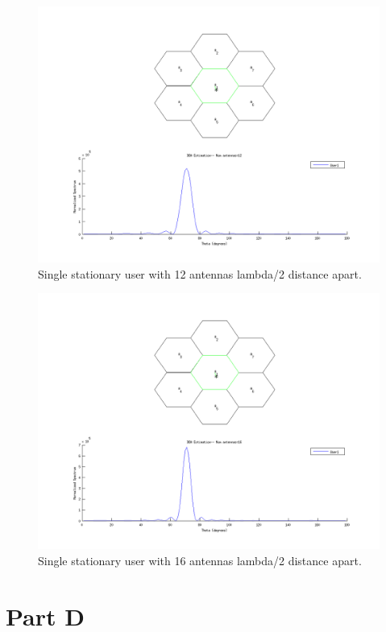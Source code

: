 \documentclass{article}
\begin{document}
\begin{figure}[h]
\centerline{\includegraphics[width=5in]{doc/partC12.png}}
\caption{Single stationary user with 12 antennas lambda/2 distance apart.}
\label{partb1}
\end{figure}

\begin{figure}[h]
\centerline{\includegraphics[width=5in]{doc/partC16.png}}
\caption{Single stationary user with 16 antennas lambda/2 distance apart.}
\label{partb1}
\end{figure}


\clearpage

\section{Part D}\label{partD}
\end{document}
